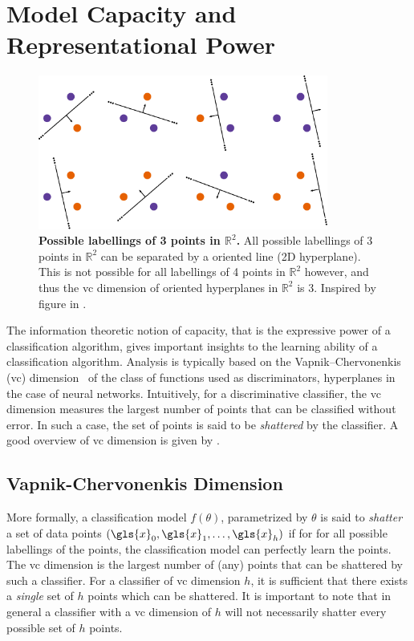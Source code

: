 \documentclass[thesis]{subfiles}
\begin{document}
    \section{Model Capacity and Representational Power}
    \begin{figure}[tbp]
        \centering
        \includegraphics[width=0.85\textwidth]{Figs/PDF/allpossibler3}
        \caption[Possible labellings of 3 points in $\mathbb{R}^2$. ]{\textbf{Possible labellings of 3 points in $\mathbb{R}^2$.} All possible labellings of 3 points in $\mathbb{R}^2$ can be separated by a oriented line (2D hyperplane). This is not possible for all labellings of 4 points in $\mathbb{R}^2$ however, and thus the \gls{vc} dimension of oriented hyperplanes in $\mathbb{R}^2$ is 3. Inspired by figure in \citet{burges1998tutorial}.}\label{fig:vcdim_r2line}
    \end{figure}
    The information theoretic notion of capacity, that is the expressive power of a classification algorithm, gives important insights to the learning ability of a classification algorithm. Analysis is typically based on the Vapnik–Chervonenkis (\gls{vc}) dimension~\citep{vapnik2015uniform} of the class of functions used as discriminators, \eg hyperplanes in the case of neural networks. Intuitively, for a discriminative classifier, the \gls{vc} dimension measures the largest number of points that can be classified without error. In such a case, the set of points is said to be \emph{shattered} by the classifier. A good overview of \gls{vc} dimension is given by \citet{burges1998tutorial}.
    
    \subsection{Vapnik-Chervonenkis Dimension}
    More formally, a classification model $f(\theta)$, parametrized by $\theta$ is said to \emph{shatter} a set of data points $(\gls{x}_0, \gls{x}_1, \ldots, \gls{x}_h)$ if for for all possible labellings of the points, the classification model can perfectly learn the points. The \gls{vc} dimension is the largest number of (any) points that can be shattered by such a classifier. For a classifier of \gls{vc} dimension $h$, it is sufficient that there exists a \emph{single} set of $h$ points which can be shattered. It is important to note that in general a classifier with a \gls{vc} dimension of $h$ will not necessarily shatter every possible set of $h$ points. 
    
\end{document}
